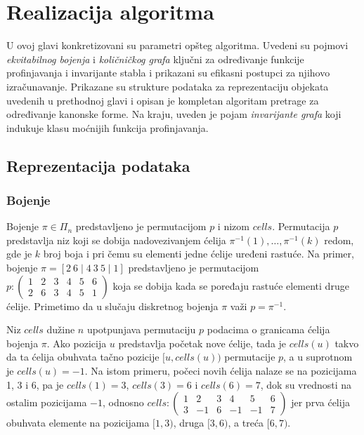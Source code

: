 \documentclass[12pt,oneside]{memoir}
\theoremstyle{definition}
\begin{document}
\chapter{Realizacija algoritma}

 U ovoj glavi konkretizovani su parametri opšteg algoritma.  Uvedeni su pojmovi
 \emph{ekvitabilnog bojenja} i \emph{količničkog grafa} ključni za određivanje
 funkcije profinjavanja i invarijante stabla i prikazani su efikasni postupci
 za njihovo izračunavanje.  Prikazane su strukture podataka za reprezentaciju
 objekata uvedenih u prethodnoj glavi i opisan je kompletan algoritam pretrage
 za određivanje kanonske forme. Na kraju, uveden je pojam \emph{invarijante
 grafa} koji indukuje klasu moćnijih funkcija profinjavanja.

 \section{Reprezentacija podataka}

  \subsection{Bojenje}

   Bojenje $\pi \in \Pi_n$ predstavljeno je permutacijom $p$ i nizom $cells$.
   Permutacija $p$ predstavlja niz koji se dobija nadovezivanjem ćelija
   $\pi^{-1}(1), \dots, \pi^{-1}(k)$ redom, gde je $k$ broj boja i pri čemu su
   elementi jedne ćelije uređeni rastuće. Na primer, bojenje $\pi = [2\ 6 \mid
   4\ 3\ 5 \mid 1]$ predstavljeno je permutacijom $p : \begin{pmatrix} 1 & 2 &
   3 & 4 & 5 & 6\\ 2 & 6 & 3 & 4 & 5 & 1 \end{pmatrix}$ koja se dobija kada se
   poređaju rastuće elementi druge ćelije. Primetimo da u slučaju diskretnog
   bojenja $\pi$ važi $p = \pi^{-1}$.

   Niz $cells$ dužine $n$ upotpunjava permutaciju $p$ podacima o granicama
   ćelija bojenja $\pi$. Ako pozicija $u$ predstavlja početak nove ćelije, tada
   je $cells(u)$ takvo da ta ćelija obuhvata tačno pozicije $[u, cells(u))$
   permutacije $p$, a u suprotnom je $cells(u) = -1$. Na istom primeru, počeci
   novih ćelija nalaze se na pozicijama 1, 3 i 6, pa je $cells(1) = 3$, $cells(3)
   = 6$ i $cells(6) = 7$, dok su vrednosti na ostalim pozicijama $-1$, odnosno
   $cells : \begin{pmatrix} 1 & 2 & 3 & 4 & 5 & 6\\3 & -1 & 6 & -1 & -1 & 7 \end{pmatrix}$ jer prva ćelija obuhvata elemente na
   pozicijama $[1,3)$, druga $[3,6)$, a treća $[6,7)$.
   
\end{document}
